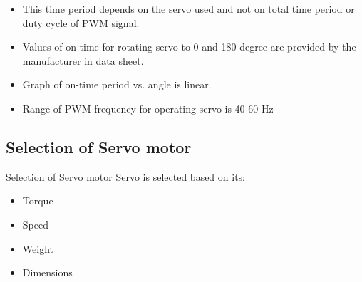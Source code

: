 \documentclass[table,10pt,red]{beamer}	%
\begin{document}
\begin{frame}
	\begin{itemize}
		\item
		This time period depends on the servo used and not on total time period or duty cycle of PWM signal.\\
		
		
		\pause
		\item
		Values of on-time for rotating servo to 0 and 180 degree are provided by the manufacturer in data sheet.\\ 
		

		\pause
		\item
		Graph of on-time period vs. angle is linear.


		\pause
		\item
		Range of PWM frequency for operating servo is 40-60 Hz
	\end{itemize}
\end{frame}

\subsection{Selection of Servo motor}
\begin{frame}{Selection of Servo motor}
	Servo is selected based on its:
	\begin{itemize}


		\pause
		\item
		Torque
		\pause
		\item		
		Speed
		\pause
		\item
		Weight
		\pause
		\item
		Dimensions

		
	\end{itemize}
\end{frame}
\end{document}
